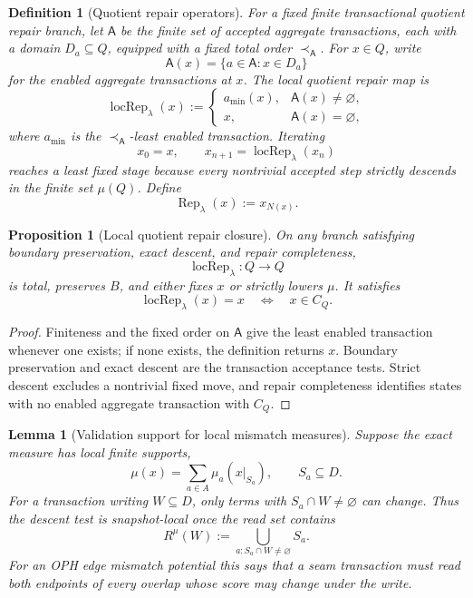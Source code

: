 \documentclass[11pt]{article}
\newtheorem{proposition}[theorem]{Proposition}
\newtheorem{lemma}[theorem]{Lemma}
\newtheorem{definition}[theorem]{Definition}
\begin{document}
\begin{definition}[Quotient repair operators]\label{def:quotient-repair-operators}
For a fixed finite transactional quotient repair branch, let \(\mathsf A\) be the finite set of
accepted aggregate transactions, each with a domain \(D_a\subseteq Q\), equipped with a fixed total
order \(\prec_{\mathsf A}\).  For \(x\in Q\), write
\[
\mathsf A(x)=\{a\in\mathsf A:x\in D_a\}
\]
for the enabled aggregate transactions at \(x\).  The local quotient repair map is
\[
\operatorname{locRep}_\lambda(x):=
\begin{cases}
a_{\min}(x),& \mathsf A(x)\ne\varnothing,\\
x,& \mathsf A(x)=\varnothing,
\end{cases}
\]
where \(a_{\min}\) is the \(\prec_{\mathsf A}\)-least enabled transaction.  Iterating
\[
x_0=x,\qquad x_{n+1}=\operatorname{locRep}_\lambda(x_n)
\]
reaches a least fixed stage because every nontrivial accepted step strictly descends in the finite
set \(\mu(Q)\).  Define
\[
\operatorname{Rep}_\lambda(x):=x_{N(x)}.
\]
\end{definition}

\begin{proposition}[Local quotient repair closure]\label{prop:local-quotient-repair-closure}
On any branch satisfying boundary preservation, exact descent, and repair completeness,
\[
\operatorname{locRep}_\lambda:Q\to Q
\]
is total, preserves \(B\), and either fixes \(x\) or strictly lowers \(\mu\).  It satisfies
\[
\operatorname{locRep}_\lambda(x)=x
\quad\Longleftrightarrow\quad
x\in C_Q.
\]
\end{proposition}

\begin{proof}
Finiteness and the fixed order on \(\mathsf A\) give the least enabled transaction whenever one
exists; if none exists, the definition returns \(x\).  Boundary preservation and exact descent are
the transaction acceptance tests.  Strict descent excludes a nontrivial fixed move, and repair
completeness identifies states with no enabled aggregate transaction with \(C_Q\).
\end{proof}

\begin{lemma}[Validation support for local mismatch measures]\label{lem:validation-support}
Suppose the exact measure has local finite supports,
\[
\mu(x)=\sum_{a\in A}\mu_a(x|_{S_a}),
\qquad S_a\subseteq D .
\]
For a transaction writing \(W\subseteq D\), only terms with \(S_a\cap W\ne\varnothing\) can change.
Thus the descent test is snapshot-local once the read set contains
\[
R^\mu(W):=\bigcup_{a:S_a\cap W\ne\varnothing}S_a .
\]
For an OPH edge mismatch potential this says that a seam transaction must read both endpoints of
every overlap whose score may change under the write.
\end{lemma}
\end{document}
